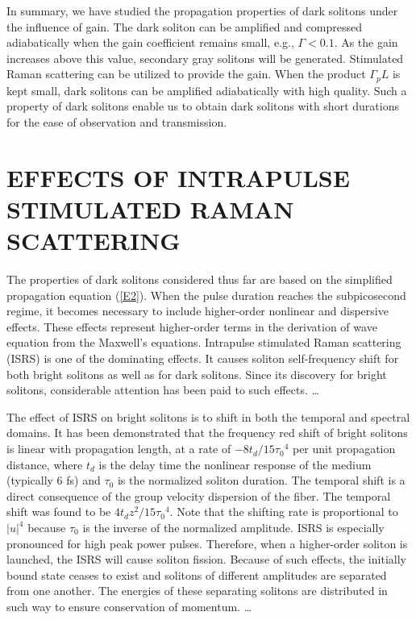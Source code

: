 In summary, we have studied the propagation properties of dark solitons
under the influence of gain.  The dark soliton can be amplified and
compressed adiabatically when the gain coefficient remains small, e.g., $
\Gamma < 0.1 $.  As the gain increases above this value, secondary gray
solitons will be generated.  Stimulated Raman scattering can be utilized to
provide the gain. When the product $ \Gamma _p L $ is kept small, dark
solitons can be amplified adiabatically with high quality. Such a property
of dark solitons enable us to obtain dark solitons with short durations for
the ease of observation and transmission.


\section{EFFECTS OF INTRAPULSE STIMULATED RAMAN SCATTERING}
\label{EIS}
The properties of dark solitons considered thus far are based on the
simplified propagation equation (\ref{E2}). When the pulse duration reaches
the subpicosecond regime, it becomes necessary to include higher-order
nonlinear and dispersive effects.\cite{ZBF} These effects represent
higher-order terms in the derivation of wave equation from the Maxwell's
equations.  Intrapulse stimulated Raman scattering (ISRS) is one of the
dominating effects.  It causes soliton self-frequency shift for both bright
solitons\cite{MG,GD} as well as for dark solitons.\cite{WD} Since its
discovery for bright solitons,\cite{ZBF} considerable attention has been
paid to such effects.
\ldots

The effect of ISRS on bright solitons  is to shift in both the temporal and
spectral domains.  It has been demonstrated that the frequency red shift of
bright solitons is linear with propagation length, at a rate of $-8t_d /15
{\tau_0}^4 $ per unit propagation distance, where $ t_d $ is the delay time
the nonlinear response of the medium (typically 6 fs) and $ \tau _{0} $ is
the normalized soliton duration.  The temporal shift is a direct
consequence of the group velocity dispersion of the fiber. The temporal
shift was found to be $4 t_d z^2 /15 {\tau_0}^4 $.\cite{BB} Note that the
shifting rate is proportional to $|u|^4 $ because $ \tau _0 $ is the
inverse of the normalized amplitude. ISRS is especially pronounced for high
peak power pulses. Therefore, when a higher-order soliton is launched, the
ISRS will cause soliton fission.\cite{TA} Because of such effects, the
initially bound state ceases to exist and solitons of different amplitudes
are separated from one another.  The energies of these separating solitons
are distributed in such way to ensure conservation of momentum.
\ldots


